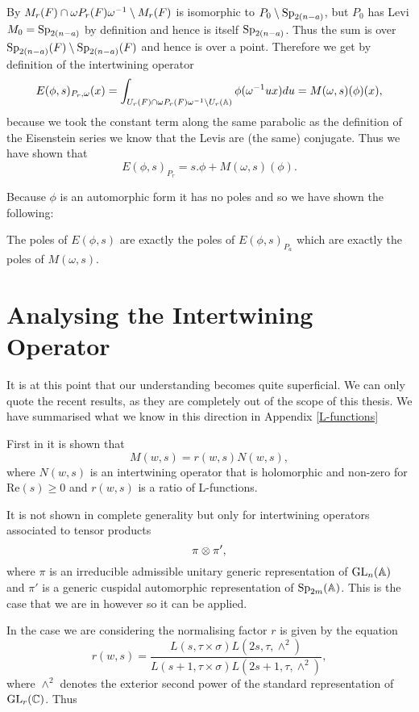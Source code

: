     By \cite[2C]{jiangPolesCertainResidual2013} \(M_r(F)\cap \omega P_r(F)\omega^{-1} \setminus M_r(F)\) is isomorphic to \(P_0 \setminus \operatorname{Sp}_{2(n-a)}\), but \(P_0\) has Levi \(M_0 = \operatorname{Sp}_{2(n-a)}\) by definition and hence is itself \(\operatorname{Sp}_{2(n-a)}\). Thus the sum is over \(\operatorname{Sp}_{2(n-a)}(F) \setminus \operatorname{Sp}_{2(n-a)}(F)\) and hence is over a point. Therefore we get by definition of the intertwining operator
     \[E(\phi, s)_{P_r, \omega}(x) = \int_{U_r(F)\cap \omega P_r(F)\omega\inv \setminus U_r(\A)} \phi( \omega\inv u x)  du = M(\omega, s)(\phi)(x),\]
     because we took the constant term along the same parabolic as the definition of the Eisenstein series we know that the Levis are (the same) conjugate.
    Thus we have shown that 
    \[E(\phi, s)_{P_r} = s.\phi + M(\omega, s )(\phi).\]
    
    Because \(\phi\) is an automorphic form it has no poles and so we have shown the following:
    \begin{Lemma}
        The poles of \(E(\phi, s)\) are exactly the poles of \(E(\phi,s)_{P_a}\) which are exactly the poles of \(M(\omega, s)\).
    \end{Lemma}
    

    \section{Analysing the Intertwining Operator}
    It is at this point that our understanding becomes quite superficial. We can only quote the recent results, as they are completely out of the scope of this thesis. We have summarised what we know in this direction in Appendix \ref{L-functions}
    
    First in \cite[11.1]{cogdellFUNCTORIALITYCLASSICALGROUPS} it is shown that 
    \[M(w, s) = r(w, s)N(w,s),\]
    where \(N(w,s)\) is an intertwining operator that is holomorphic and non-zero for \(\mathrm{Re}(s)\geq 0\) and \(r(w, s)\) is a ratio of L-functions.
    \begin{remark}
    	It is not shown in complete generality but only for intertwining operators associated to tensor products
    	\[\pi\otimes \pi',\]
    	where \(\pi\) is an irreducible admissible unitary generic representation of \(\GL_n(\A)\) and \(\pi'\) is a generic cuspidal automorphic representation of \(\Sp_{2m}(\A)\). This is the case that we are in however so it can be applied. 
    \end{remark}
    
     In the case we are considering the normalising factor \(r\) is given by the equation \cite[4A]{jiangPolesCertainResidual2013}
     \[r(w, s) = \frac{L(s, \tau\times \sigma)L(2s, \tau,\wedge^2)}{L(s+1, \tau\times \sigma)L(2s+1, \tau, \wedge^2)},\]
    where \(\wedge^2\) denotes the exterior second power of the standard representation of \(\GL_r(\C)\). Thus

